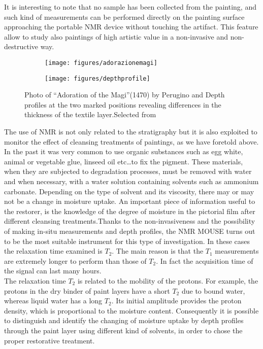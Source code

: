 \documentclass[a4paper,11pt]{report}
\begin{document}
It is interesting to note that no sample has been collected from the painting, and such kind of measurements can be performed directly on the painting surface approaching the portable NMR device without touching the artifact. This feature allow to study also paintings of high artistic value in a non-invasive and non-destructive way.
\begin{figure}[h]
	


\begin{subfigure}{0.5\textwidth}
\texttt{[image: figures/adorazionemagi]} 
\caption{}

\end{subfigure}
\begin{subfigure}{0.5\textwidth}
\texttt{[image: figures/depthprofile]}
\caption{}

\end{subfigure}


\caption{Photo of “Adoration of the Magi”(1470) by Perugino and Depth profiles at the two marked positions revealing differences in the thickness of the textile layer.Selected from \cite{quattropaint}}\label{adorazionemagi}
\end{figure}

The use of NMR is not only related to the stratigraphy but it is also exploited to monitor the effect of cleansing treatments of paintings, as we have foretold above. In the past it was very common to use organic substances such as egg white, animal or vegetable glue, linseed oil etc\dots to fix the pigment. These materials, when they are subjected to degradation processes, must be removed with water and when necessary, with a water solution containing solvents such as ammonium carbonate. Depending on the type of solvent and its viscosity, there may or may not be a change in moisture uptake. An important piece of information useful to the restorer, is the knowledge of the degree of moisture in the pictorial film after different cleansing treatments.Thanks to the non-invasiveness and the possibility of making in-situ measurements and depth profiles, the NMR MOUSE turns out to be the most suitable instrument for this type of investigation\cite{exseifresco}.
In these cases the relaxation time examined is $T_2$. The main reason is that the $T_1$ measurements are extremely longer to perform than those of $T_2$. In fact the acquisition time of the signal can last many hours.\\ 
 The relaxation time $T_2$ is related to the mobility of the protons. For example, the protons in the dry binder of paint layers have a short $T_2$ due to bound water, whereas liquid water has a long $T_2$. Its initial amplitude provides the proton density, which is proportional to the moisture content. Consequently it is possible to distinguish and identify the changing of moisture uptake by depth profiles through the paint layer using different kind of solvents, in order to chose the proper restorative treatment\cite{exseifresco}.
\end{document}
